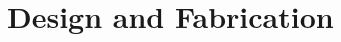 \documentclass{article}
\begin{document}
\begin{multicols}{5}
\begin{itemize}

\end{itemize}
\section{Design and Fabrication}

\end{multicols}
\end{document}
